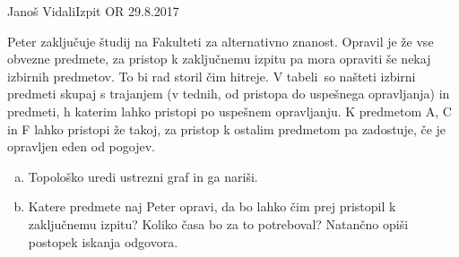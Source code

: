 \begin{naloga}{Janoš Vidali}{Izpit OR 29.8.2017}
\begin{vprasanje}
Peter zaključuje študij na Fakulteti za alternativno znanost.
Opravil je že vse obvezne predmete,
za pristop k zaključnemu izpitu pa mora opraviti še nekaj izbirnih predmetov.
To bi rad storil čim hitreje.
V tabeli~\tab so našteti izbirni predmeti
skupaj s trajanjem (v tednih, od pristopa do uspešnega opravljanja)
in predmeti, h katerim lahko pristopi po uspešnem opravljanju.
K predmetom A, C in F lahko pristopi že takoj,
za pristop k ostalim predmetom pa zadostuje, če je opravljen eden od pogojev.

\begin{enumerate}[(a)]
\item Topološko uredi ustrezni graf in ga nariši.
\item Katere predmete naj Peter opravi,
da bo lahko čim prej pristopil k zaključnemu izpitu?
Koliko časa bo za to potreboval?
Natančno opiši postopek iskanja odgovora.
\end{enumerate}

\begin{tabela}
\end{tabela}
\end{vprasanje}
\begin{odgovor}
\end{odgovor}
\end{naloga}
